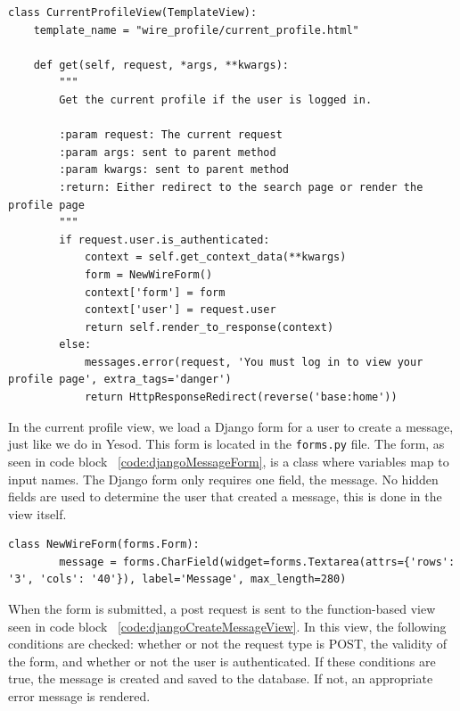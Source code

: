 \begin{lstlisting}[caption={Class-based current profile view},label={code:djangoCurrentProfileView}]
	class CurrentProfileView(TemplateView):
	template_name = "wire_profile/current_profile.html"

	def get(self, request, *args, **kwargs):
		"""
		Get the current profile if the user is logged in.

		:param request: The current request
		:param args: sent to parent method
		:param kwargs: sent to parent method
		:return: Either redirect to the search page or render the profile page
		"""
		if request.user.is_authenticated:
			context = self.get_context_data(**kwargs)
			form = NewWireForm()
			context['form'] = form
			context['user'] = request.user
			return self.render_to_response(context)
		else:
			messages.error(request, 'You must log in to view your profile page', extra_tags='danger')
			return HttpResponseRedirect(reverse('base:home'))
\end{lstlisting}

In the current profile view, we load a Django form for a user to create a message,
just like we do in Yesod. This form is located in the \texttt{forms.py} file. The
form, as seen in code block ~\ref{code:djangoMessageForm}, is a class where variables map
to input names. The Django form only requires one field, the message. No hidden
fields are used to determine the user that created a message, this is done in
the view itself.

\begin{lstlisting}[caption={Django message form},label={code:djangoMessageForm}]
	class NewWireForm(forms.Form):
		message = forms.CharField(widget=forms.Textarea(attrs={'rows': '3', 'cols': '40'}), label='Message', max_length=280)
\end{lstlisting}

When the form is submitted, a post request is sent to the function-based view
seen in code block ~\ref{code:djangoCreateMessageView}. In this view, the following
conditions are checked: whether or not the request type is POST, the validity of the
form, and whether or not the user is authenticated. If these conditions are true,
the message is created and saved to the database. If not, an appropriate error
message is rendered.


